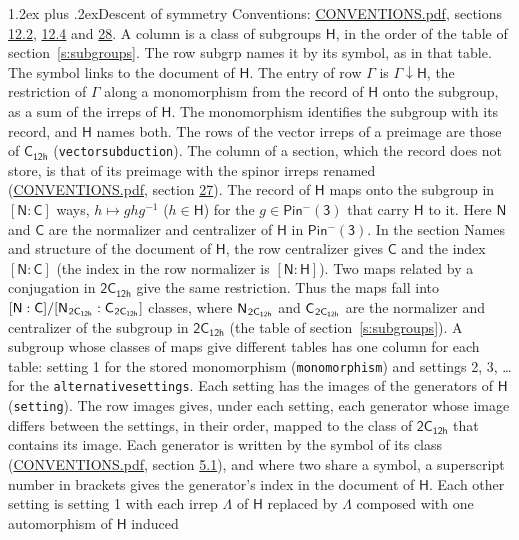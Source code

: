 \documentclass[10pt,a4paper]{article}
\makeatletter
\renewcommand\section{\@startsection{section}{1}{\z@}{-3ex plus -1ex minus -.2ex}%
  {1.2ex plus .2ex}{\normalfont\large\sffamily\bfseries\color{parttitle}}}
\numberwithin{equation}{section}
\newcommand{\grp}[1]{\mathsf{#1}}
\newcommand{\grpindex}[2]{[#1 : #2]}
\newcommand{\restr}[2]{#1\!\downarrow#2}
\newcommand{\hairsp}{\mkern1mu}
\makeatother
\begin{document}
\section{Descent of symmetry}\label{s:subduction}
Conventions: \href{../../CONVENTIONS.pdf}{CONVENTIONS.pdf}, sections \href{../../../rotation/CONVENTIONS.pdf\#conv.12.2}{12.2}, \href{../../../rotation/CONVENTIONS.pdf\#conv.12.4}{12.4} and \href{../../CONVENTIONS.pdf\#conv.28}{28}.
A column is a class of subgroups $\grp{H}$, in the order of the table of section~\ref{s:subgroups}. The row subgrp names it by its symbol, as in that table. The symbol links to the document of $\grp{H}$. The entry of row $\Gamma$ is $\restr{\Gamma}{\grp{H}}$, the restriction of $\Gamma$ along a monomorphism from the record of $\grp{H}$ onto the subgroup, as a sum of the irreps of $\grp{H}$. The monomorphism identifies the subgroup with its record, and $\grp{H}$ names both. The rows of the vector irreps of a preimage are those of \href{../../../rotation/data/pdf/C12h.pdf}{$\grp{C_{12h}}$} (\texttt{vectorsubduction}). The column of a section, which the record does not store, is that of its preimage with the spinor irreps renamed (\href{../../CONVENTIONS.pdf}{CONVENTIONS.pdf}, section \href{../../CONVENTIONS.pdf\#conv.27}{27}). \label{n:group.normalizer.o3}\label{n:group.centralizer.o3}\label{n:element.h}The record of $\grp{H}$ maps onto the subgroup in $\grpindex{\grp{N}}{\grp{C}}$ ways, $h \mapsto g h g^{-1}$ ($h \in \grp{H}$) for the $g \in \grp{Pin^{-}(3)}$ that carry $\grp{H}$ to it. Here $\grp{N}$ and $\grp{C}$ are the normalizer and centralizer of $\grp{H}$ in \href{Pinminus3.pdf}{$\grp{Pin^{-}(3)}$}. In the section Names and structure of the document of $\grp{H}$, the row centralizer gives $\grp{C}$ and the index $\grpindex{\grp{N}}{\grp{C}}$ (the index in the row normalizer is $\grpindex{\grp{N}}{\grp{H}}$). Two maps related by a conjugation in $\grp{2C_{12h}}$ give the same restriction. Thus the maps fall into $\grpindex{\grp{N}}{\grp{C}}/\grpindex{\grp{N}_{\hairsp \grp{2C_{12h}}}}{\grp{C}_{\hairsp \grp{2C_{12h}}}}$ classes, where $\grp{N}_{\hairsp \grp{2C_{12h}}}$ and $\grp{C}_{\hairsp \grp{2C_{12h}}}$ are the normalizer and centralizer of the subgroup in $\grp{2C_{12h}}$ (the table of section~\ref{s:subgroups}). \label{n:head.setting}A subgroup whose classes of maps give different tables has one column for each table: setting 1 for the stored monomorphism (\texttt{monomorphism}) and settings 2, 3, \dots{} for the \texttt{alternativesettings}. Each setting has the images of the generators of $\grp{H}$ (\texttt{setting}). \label{n:head.images}The row images gives, under each setting, each generator whose image differs between the settings, in their order, mapped to the class of $\grp{2C_{12h}}$ that contains its image. Each generator is written by the symbol of its class (\href{../../CONVENTIONS.pdf}{CONVENTIONS.pdf}, section \href{../../../rotation/CONVENTIONS.pdf\#conv.5.1}{5.1}), and where two share a symbol, a superscript number in brackets gives the generator's index in the document of $\grp{H}$. \label{n:irrep.Delta}Each other setting is setting 1 with each irrep $\Lambda$ of $\grp{H}$ replaced by $\Lambda$ composed with one automorphism of $\grp{H}$ induced 
\end{document}
